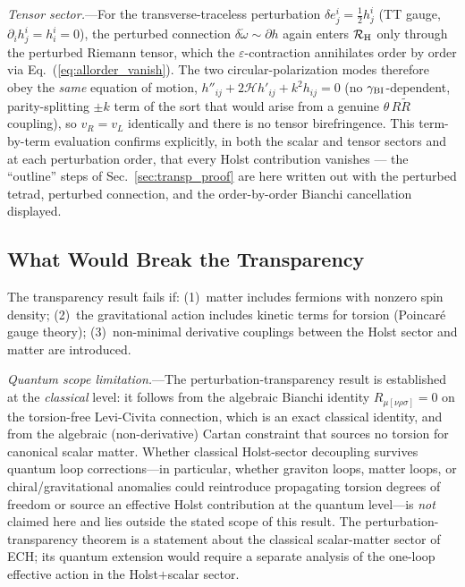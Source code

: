 \documentclass[aps,prd,twocolumn,superscriptaddress,showpacs,preprintnumbers,nofootinbib,longbibliography,floatfix]{revtex4-2}
\begin{document}
\textit{Tensor sector.}---For the transverse-traceless perturbation
$\delta e^i_j=\tfrac12 h^i_j$ (TT gauge, $\partial_ih^i_j=h^i_i=0$), the
perturbed connection $\delta\mathring\omega\sim\partial h$ again enters
$\mathcal{R}_{\rm H}$ only through the perturbed Riemann tensor, which the
$\varepsilon$-contraction annihilates order by order via
Eq.~(\ref{eq:allorder_vanish}). The two circular-polarization modes therefore
obey the \emph{same} equation of motion,
$h''_{ij}+2\mathcal{H}h'_{ij}+k^2h_{ij}=0$ (no $\gamma_{\rm BI}$-dependent,
parity-splitting $\pm k$ term of the sort that would arise from a genuine
$\theta\,R\tilde R$ coupling), so $v_R=v_L$ identically and there is no tensor
birefringence. This term-by-term evaluation confirms explicitly, in both the
scalar and tensor sectors and at each perturbation order, that every Holst
contribution vanishes --- the ``outline'' steps of Sec.~\ref{sec:transp_proof}
are here written out with the perturbed tetrad, perturbed connection, and the
order-by-order Bianchi cancellation displayed.

\subsection{What Would Break the Transparency}

The transparency result fails if: (1)~matter includes fermions with nonzero
spin density; (2)~the gravitational action includes kinetic terms for torsion
(Poincar\'{e} gauge theory); (3)~non-minimal derivative couplings between the
Holst sector and matter are introduced.

\textit{Quantum scope limitation.}---The perturbation-transparency result is
established at the \emph{classical} level: it follows from the algebraic
Bianchi identity $R_{\mu[\nu\rho\sigma]}=0$ on the torsion-free Levi-Civita
connection, which is an exact classical identity, and from the algebraic
(non-derivative) Cartan constraint that sources no torsion for canonical
scalar matter. Whether classical Holst-sector decoupling survives quantum loop
corrections---in particular, whether graviton loops, matter loops, or
chiral/gravitational anomalies could reintroduce propagating torsion degrees of
freedom or source an effective Holst contribution at the quantum level---is
\emph{not} claimed here and lies outside the stated scope of this result.
The perturbation-transparency theorem is a statement about the classical
scalar-matter sector of ECH; its quantum extension would require a separate
analysis of the one-loop effective action in the Holst$+$scalar sector.
\end{document}
